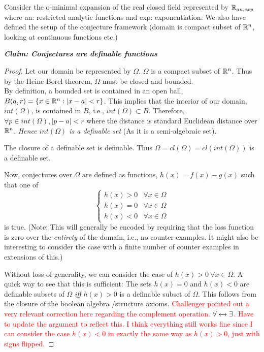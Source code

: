 \begin{definition}
Consider the o-minimal expansion of the real closed field represented by $\mathbb{R}_{an, exp}$ where an: restricted analytic functions and exp: exponentiation. We also have defined the setup of the conjecture framework (domain is compact subset of $\mathbb{R}^n$, looking at continuous functions etc.) \par\textbf{\textit{Claim: Conjectures are definable functions}}


\begin{proof}
    Let our domain be represented by $\Omega$. $\Omega$ is a compact subset of $\mathbb{R}^n$. Thus by the Heine-Borel theorem, $\Omega$ must be closed and bounded.\\ By definition, a bounded set is contained in an open ball, $B(a,r) = \{x\in\mathbb{R}^n:|x - a| < r\}$. This implies that the interior of our domain, $int(\Omega)$, is contained in $B$, i.e., $int(\Omega)\subset B$. Therefore, $\forall p\in int(\Omega), |p - a| < r$ where the distance is standard Euclidean distance over $\mathbb{R}^n$.\textit{ Hence $int(\Omega)$ is a definable set} (As it is a semi-algebraic set). 

    The closure of a definable set is definable. Thus $\Omega = cl(\Omega) = cl(int(\Omega))$ is a definable set.

    Now, conjectures over $\Omega$ are defined as functions, $h(x) = f(x) - g(x)$ such that one of
    \begin{equation*}
        \begin{cases}
            h(x) > 0 & \forall x \in \Omega \\
            h(x) = 0 & \forall x \in \Omega \\
            h(x) < 0 & \forall x \in \Omega 
        \end{cases}    
    \end{equation*}
    is true. (Note: This will generally be encoded by requiring that the loss function is zero over the \textit{entirety} of the domain, i.e., no counter-examples. It might also be interesting to consider the case with a finite number of counter examples in extensions of this.)
    \par Without loss of generality, we can consider the case of $h(x) > 0 \:\forall x\in\Omega$. A quick way to see that this is sufficient: The sets $h(x) = 0$ and $h(x) < 0 $ are definable subsets of $\Omega$ \textit{iff} $h(x) > 0$ is a definable subset of $\Omega$. This follows from the closure of the boolean algebra /structure axioms.
    \textcolor{red}{Challenger pointed out a very relevant correction here regarding the complement operation. $\forall\xleftrightarrow{}\exists$. Have to update the argument to reflect this. I think everything still works fine since I can consider the case $h(x) < 0$ in exactly the same way as $h(x) > 0$, just with signs flipped.}
    

\end{proof}
\end{definition}
